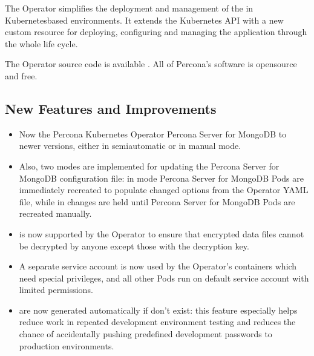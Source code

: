 \documentclass[letterpaper,10pt,english]{sphinxmanual}
\begin{document}
The Operator simplifies the deployment and management of the  in Kubernetes\sphinxhyphen{}based environments. It extends the Kubernetes API with a new custom resource for deploying, configuring and managing the application through the whole life cycle.

The Operator source code is available . All of Percona’s software is open\sphinxhyphen{}source and free.


\subsection{New Features and Improvements}
\label{\detokenize{RN/Kubernetes-Operator-for-PSMONGODB-RN1.1.0:new-features-and-improvements}}\begin{itemize}
\item {} 
Now the Percona Kubernetes Operator  Percona Server for MongoDB to newer versions, either in semi\sphinxhyphen{}automatic or in manual mode.

\item {} 
Also, two modes are implemented for updating the Percona Server for MongoDB  configuration file: in  mode Percona Server for MongoDB Pods are immediately re\sphinxhyphen{}created to populate changed options from the Operator YAML file, while in  changes are held until Percona Server for MongoDB Pods are re\sphinxhyphen{}created manually.

\item {} 
 is now supported by the Operator to ensure that encrypted data files cannot be decrypted by anyone except those with the decryption key.

\item {} 
A separate service account is now used by the Operator’s containers which need special privileges, and all other Pods run on default service account with limited permissions.

\item {} 
 are now generated automatically if don’t exist: this feature especially helps reduce work in repeated development environment testing and reduces the chance of accidentally pushing predefined development passwords to production environments.


\end{itemize}
\end{document}
